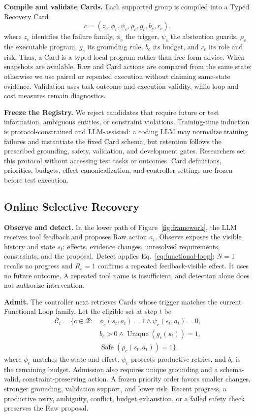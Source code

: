 \textbf{Compile and validate Cards.} Each supported group is compiled into a
Typed Recovery Card
\begin{equation}
c=(z_c,\phi_c,\psi_c,\rho_c,g_c,b_c,r_c),
\label{eq:card}
\end{equation}
where $z_c$ identifies the failure family, $\phi_c$ the trigger, $\psi_c$ the
abstention guards, $\rho_c$ the executable program, $g_c$ its grounding rule,
$b_c$ its budget, and $r_c$ its role and risk. Thus, a Card is a typed local
program rather than free-form advice. When snapshots are available, Raw and
Card actions are compared from the same state; otherwise we use paired or
repeated execution without claiming same-state evidence. Validation uses task
outcome and execution validity, while loop and cost measures remain
diagnostics.

\textbf{Freeze the Registry.} We reject candidates that require future or test
information, ambiguous entities, or constraint violations. Training-time
induction is protocol-constrained and LLM-assisted: a coding LLM may normalize
training failures and instantiate the fixed Card schema, but retention follows
the prescribed grounding, safety, validation, and development gates.
Researchers set this protocol without accessing test tasks or outcomes. Card
definitions, priorities, budgets, effect canonicalization, and controller
settings are frozen before test execution.

\subsection*{Online Selective Recovery}

\textbf{Observe and detect.} In the lower path of
Figure~\ref{fig:framework}, the LLM receives tool feedback and proposes Raw
action $a_t$. Observe exposes the visible history and state $s_t$: effects,
evidence changes, unresolved requirements, constraints, and the proposal.
Detect applies Eq.~\ref{eq:functional-loop}; $N=1$ recalls no progress and
$R_e=1$ confirms a repeated feedback-visible effect. It uses no future outcome.
A repeated tool name is insufficient, and detection alone does not authorize
intervention.

\textbf{Admit.} The controller next retrieves Cards whose trigger matches the
current Functional Loop family. Let the eligible set at step $t$ be
\begin{equation}
\begin{aligned}
\mathcal{C}_t=\{c\in\mathcal{R}:{}&\phi_c(s_t,a_t)=1
\land\psi_c(s_t,a_t)=0,\\
&b_c>0\land\operatorname{Unique}(g_c(s_t))=1,\\
&\operatorname{Safe}(\rho_c(s_t,a_t))=1\}.
\end{aligned}
\label{eq:eligible}
\end{equation}
where $\phi_c$ matches the state and effect, $\psi_c$ protects productive
retries, and $b_c$ is the remaining budget. Admission also requires unique
grounding and a schema-valid, constraint-preserving action. A frozen priority
order favors smaller changes, stronger grounding, validation support, and
lower risk. Recent progress, a productive retry, ambiguity, conflict, budget
exhaustion, or a failed safety check preserves the Raw proposal.

